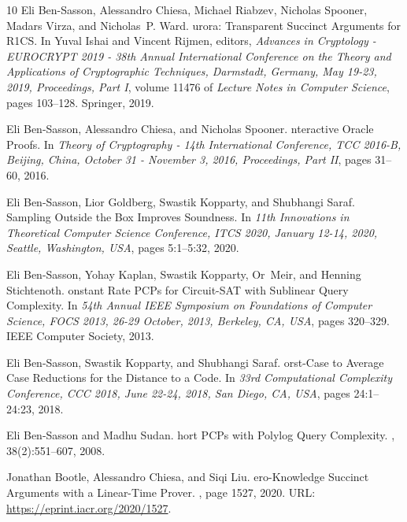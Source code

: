 \documentclass[10pt,a4paper]{article}
\theoremstyle{plain}
\theoremstyle{plain}
\theoremstyle{definition}
\theoremstyle{remark}
\theoremstyle{plain}
\begin{document}
\begin{thebibliography}{10}
Eli Ben{-}Sasson, Alessandro Chiesa, Michael Riabzev, Nicholas Spooner, Madars
  Virza, and Nicholas~P. Ward.
urora: {T}ransparent {S}uccinct {A}rguments for {{R}1{C}{S}}.
\newblock In Yuval Ishai and Vincent Rijmen, editors, {\em Advances in
  Cryptology - {EUROCRYPT} 2019 - 38th Annual International Conference on the
  Theory and Applications of Cryptographic Techniques, Darmstadt, Germany, May
  19-23, 2019, Proceedings, Part {I}}, volume 11476 of {\em Lecture Notes in
  Computer Science}, pages 103--128. Springer, 2019.

Eli Ben{-}Sasson, Alessandro Chiesa, and Nicholas Spooner.
nteractive {O}racle {P}roofs.
\newblock In {\em Theory of Cryptography - 14th International Conference, {TCC}
  2016-B, Beijing, China, October 31 - November 3, 2016, Proceedings, Part
  {II}}, pages 31--60, 2016.

Eli Ben{-}Sasson, Lior Goldberg, Swastik Kopparty, and Shubhangi Saraf.
 {S}ampling {O}utside the {B}ox {I}mproves
  {S}oundness.
\newblock In {\em 11th Innovations in Theoretical Computer Science Conference,
  {ITCS} 2020, January 12-14, 2020, Seattle, Washington, {USA}}, pages
  5:1--5:32, 2020.

Eli Ben{-}Sasson, Yohay Kaplan, Swastik Kopparty, Or~Meir, and Henning
  Stichtenoth.
onstant {R}ate {{P}{C}{P}}s for {C}ircuit-{S}{A}{T} with
  {S}ublinear {Q}uery {C}omplexity.
\newblock In {\em 54th Annual {IEEE} Symposium on Foundations of Computer
  Science, {FOCS} 2013, 26-29 October, 2013, Berkeley, CA, {USA}}, pages
  320--329. {IEEE} Computer Society, 2013.

Eli Ben{-}Sasson, Swastik Kopparty, and Shubhangi Saraf.
orst-{C}ase to {A}verage {C}ase {R}eductions for the {D}istance to
  a {C}ode.
\newblock In {\em 33rd Computational Complexity Conference, {CCC} 2018, June
  22-24, 2018, San Diego, CA, {USA}}, pages 24:1--24:23, 2018.

Eli Ben{-}Sasson and Madhu Sudan.
hort {{P}{C}{P}}s with {P}olylog {Q}uery {C}omplexity.
, 38(2):551--607, 2008.

Jonathan Bootle, Alessandro Chiesa, and Siqi Liu.
ero-{K}nowledge {S}uccinct {A}rguments with a {L}inear-{T}ime
  {P}rover.
, page 1527, 2020.
\newblock URL: \url{https://eprint.iacr.org/2020/1527}.


\end{thebibliography}
\end{document}
